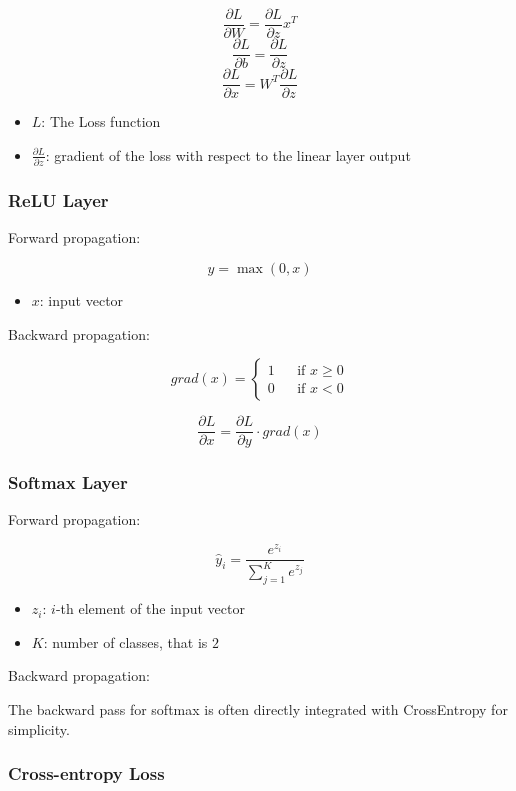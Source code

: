 $$ \frac{\partial L}{\partial W} = \frac{\partial L}{\partial z} x^T $$
$$ \frac{\partial L}{\partial b} = \frac{\partial L}{\partial z} $$
$$ \frac{\partial L}{\partial x} = W^T \frac{\partial L}{\partial z} $$


\begin{itemize}
  \item $L$: The Loss function
  \item $\frac{\partial L}{\partial z}$: gradient of the loss with respect to the linear layer output
\end{itemize}


\subsubsection{ReLU Layer}

Forward propagation:

$$ y = \max(0, x) $$

\begin{itemize}
  \item $x$: input vector
\end{itemize}

Backward propagation:

$$
grad(x)=
\left\{
  \begin{aligned}
    1 && \text{if $x \geq 0$}\\
    0 && \text{if $x < 0$}
  \end{aligned}
  \right.
  $$

  $$ \frac{\partial L}{\partial x} = \frac{\partial L}{\partial y} \cdot grad(x) $$

  \subsubsection{Softmax Layer}

  Forward propagation:

  $$ \hat{y}_i = \frac{e^{z_i}}{\sum_{j=1}^{K} e^{z_j}} $$

  \begin{itemize}
    \item $z_i$: $i$-th element of the input vector
    \item $K$: number of classes, that is $2$
  \end{itemize}

  Backward propagation:

  The backward pass for softmax is often directly integrated with CrossEntropy for simplicity.

  \subsubsection{Cross-entropy Loss}


